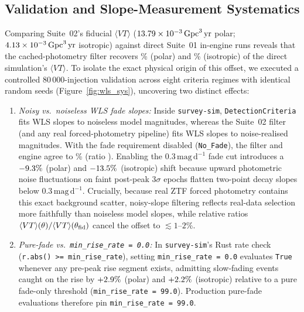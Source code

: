 \documentclass[twocolumn]{aastex631}
\newcommand{\vteff}{\langle VT\rangle}
\begin{document}
\subsection{Validation and Slope-Measurement Systematics}
\label{sec:validation}
Comparing Suite~02's fiducial $\vteff$ ($13.79{} \times 10^{-3}\,\mathrm{Gpc}^3\,\mathrm{yr}$ polar; $4.13{} \times 10^{-3}\,\mathrm{Gpc}^3\,\mathrm{yr}$ isotropic) against direct Suite~01 in-engine runs reveals that the cached-photometry filter recovers \SuiteTwoOverOnePolarPct{}\% (polar) and \SuiteTwoOverOneIsoPct{}\% (isotropic) of the direct simulation's $\vteff$. To isolate the exact physical origin of this offset, we executed a controlled $80\,000$-injection validation across eight criteria regimes with identical random seeds (Figure~\ref{fig:wls_sys}), uncovering two distinct effects:
\begin{enumerate}
    \item \emph{Noisy vs.\ noiseless WLS fade slopes:} Inside \texttt{survey-sim}, \texttt{DetectionCriteria} fits WLS slopes to noiseless model magnitudes, whereas the Suite~02 filter (and any real forced-photometry pipeline) fits WLS slopes to noise-realised magnitudes. With the fade requirement disabled (\texttt{No\_Fade}), the filter and engine agree to \NoFadeFilterMinusEnginePct{}\% (ratio \NoFadeNoisyRatioPolar{}). Enabling the $0.3\,\mathrm{mag\,d}^{-1}$ fade cut introduces a $-9.3{}\%$ (polar) and $-13.5{}\%$ (isotropic) shift because upward photometric noise fluctuations on faint post-peak $3\sigma$ epochs flatten two-point decay slopes below $0.3\,\mathrm{mag\,d}^{-1}$. Crucially, because real ZTF forced photometry contains this exact background scatter, noisy-slope filtering reflects real-data selection more faithfully than noiseless model slopes, while relative ratios $\vteff(\theta)/\vteff(\theta_{\rm fid})$ cancel the offset to $\lesssim 1$--$2\%$.
    \item \emph{Pure-fade vs.\ \texttt{min\_rise\_rate = 0.0}:} In \texttt{survey-sim}'s Rust rate check (\texttt{r.abs() >= min\_rise\_rate}), setting \texttt{min\_rise\_rate = 0.0} evaluates \texttt{True} whenever any pre-peak rise segment exists, admitting slow-fading events caught on the rise by $+2.9{}\%$ (polar) and $+2.2{}\%$ (isotropic) relative to a pure fade-only threshold (\texttt{min\_rise\_rate = 99.0}). Production pure-fade evaluations therefore pin \texttt{min\_rise\_rate = 99.0}.
\end{enumerate}
\end{document}
